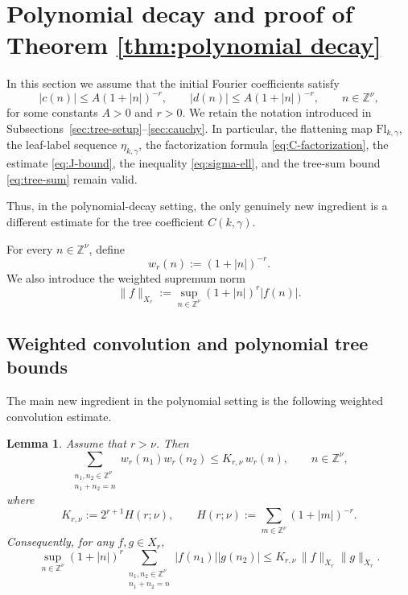 \documentclass[12pt,reqno,tbtags]{amsart}
\newtheorem{lemma}{Lemma}[section]
\newcommand\1{\mathbbm{1}}
\begin{document}
\section{Polynomial decay and proof of Theorem \ref{thm:polynomial decay}}\label{sec:3}

In this section we assume that the initial Fourier coefficients satisfy
\begin{equation}\label{eq:poly-initial-cd}
|c(n)|\le A(1+|n|)^{-r},
\qquad
|d(n)|\le A(1+|n|)^{-r},
\qquad n\in\mathbb Z^\nu,
\end{equation}
for some constants $A>0$ and $r>0$. We retain the notation introduced in
Subsections~\ref{sec:tree-setup}--\ref{sec:cauchy}. In particular, the flattening map
$\mathrm{Fl}_{k,\gamma}$, the leaf-label sequence $\eta_{k,\gamma}$, the factorization
formula \eqref{eq:C-factorization}, the estimate \eqref{eq:J-bound}, the inequality
\eqref{eq:sigma-ell}, and the tree-sum bound \eqref{eq:tree-sum} remain valid.

Thus, in the polynomial-decay setting, the only genuinely new ingredient is a different
estimate for the tree coefficient $C(k,\gamma)$.


For every $n\in\mathbb Z^\nu$, define
\[
w_r(n):=(1+|n|)^{-r}.
\]
We also introduce the weighted supremum norm
\[
\|f\|_{X_r}:=\sup_{n\in\mathbb Z^\nu}(1+|n|)^r|f(n)|.
\]

\subsection{Weighted convolution and polynomial tree bounds}

The main new ingredient in the polynomial setting is the following weighted convolution
estimate.

\begin{lemma}\label{lem:weighted-convolution}
Assume that $r>\nu$. Then
\begin{equation}\label{eq:weighted-convolution}
\sum_{\substack{n_1,n_2\in\mathbb Z^\nu\\ n_1+n_2=n}}
w_r(n_1)w_r(n_2)
\le
K_{r,\nu}\,w_r(n),
\qquad n\in\mathbb Z^\nu,
\end{equation}
where
\[
K_{r,\nu}:=2^{r+1}H(r;\nu),
\qquad
H(r;\nu):=\sum_{m\in\mathbb Z^\nu}(1+|m|)^{-r}.
\]
Consequently, for any $f,g\in X_r$,
\begin{equation}\label{eq:Xr-algebra}
\sup_{n\in\mathbb Z^\nu}(1+|n|)^r
\sum_{\substack{n_1,n_2\in\mathbb Z^\nu\\ n_1+n_2=n}}
|f(n_1)||g(n_2)|
\le
K_{r,\nu}\,\|f\|_{X_r}\|g\|_{X_r}.
\end{equation}
\end{lemma}
\end{document}
